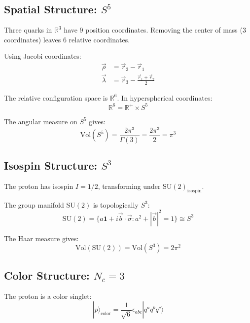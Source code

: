 \subsection{Spatial Structure: $S^5$}

Three quarks in $\mathbb{R}^3$ have 9 position coordinates. Removing the center of mass (3 coordinates) leaves 6 relative coordinates.

Using Jacobi coordinates:
\begin{align}
\vec{\rho} &= \vec{r}_2 - \vec{r}_1 \\
\vec{\lambda} &= \vec{r}_3 - \frac{\vec{r}_1 + \vec{r}_2}{2}
\end{align}

The relative configuration space is $\mathbb{R}^6$. In hyperspherical coordinates:
\begin{equation}
\mathbb{R}^6 = \mathbb{R}^+ \times S^5
\end{equation}

The angular measure on $S^5$ gives:
\begin{equation}
\text{Vol}(S^5) = \frac{2\pi^3}{\Gamma(3)} = \frac{2\pi^3}{2} = \pi^3
\end{equation}

\subsection{Isospin Structure: $S^3$}

The proton has isospin $I = 1/2$, transforming under $\text{SU}(2)_{\text{isospin}}$.

The group manifold $\text{SU}(2)$ is topologically $S^3$:
\begin{equation}
\text{SU}(2) = \{a\mathbf{1} + i\vec{b}\cdot\vec{\sigma} : a^2 + |\vec{b}|^2 = 1\} \cong S^3
\end{equation}

The Haar measure gives:
\begin{equation}
\text{Vol}(\text{SU}(2)) = \text{Vol}(S^3) = 2\pi^2
\end{equation}

\subsection{Color Structure: $N_c = 3$}

The proton is a color singlet:
\begin{equation}
|p\rangle_{\text{color}} = \frac{1}{\sqrt{6}} \epsilon_{abc} |q^a q^b q^c\rangle
\end{equation}

